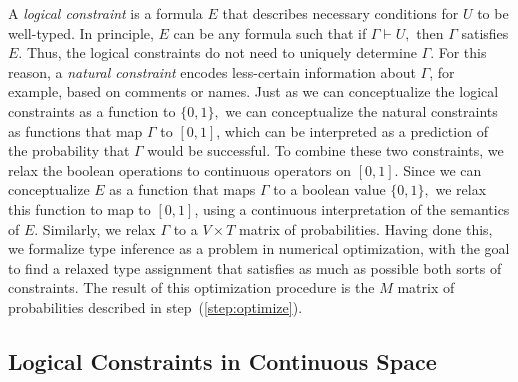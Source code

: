 \documentclass[sigplan,10pt,review,anonymous]{acmart} %
\theoremstyle{plain}
\theoremstyle{remark}
\theoremstyle{definition}
\newtheorem{defn}{Definition}[section]
\begin{document}
A \emph{logical constraint} is a formula $E$ that describes
necessary conditions for $U$ to be well-typed.
In principle, $E$ can be any formula such that if $\Gamma \vdash U,$
then $\Gamma$ satisfies $E$.
Thus, the logical constraints
do not need to uniquely determine $\Gamma$.
For this reason, a \emph{natural constraint}
encodes less-certain information about $\Gamma$,
for example, based on comments or names.
Just as we can conceptualize the logical
constraints as a function to $\{0, 1\},$
we can conceptualize the natural constraints as functions
that map $\Gamma$ to $[0, 1]$, which can be interpreted
as a prediction of the probability that $\Gamma$ would
be successful. To combine these two constraints, we relax the boolean operations to continuous operators on $[0, 1]$.
Since we can conceptualize $E$ as a function
that maps $\Gamma$ to a boolean value $\{0, 1\},$
we relax this function to map to $[0,1]$, using
a continuous interpretation of the semantics of $E$.
Similarly, we relax $\Gamma$ to a $V \times T$ matrix of probabilities.
Having done this,
we formalize type inference as a problem in
numerical optimization, with the goal to find a relaxed type assignment
that satisfies as much as possible both sorts of constraints.
The result of this optimization procedure is the
$M$ matrix of probabilities described in step~(\ref{step:optimize}).

\subsection{Logical Constraints in Continuous Space}\label{ssec:logcon}

%
\end{document}
